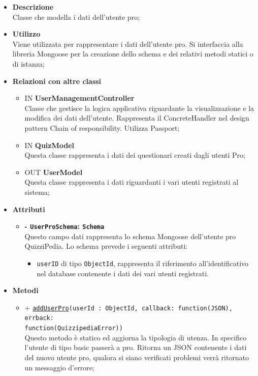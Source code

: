 \begin{itemize}
	\item \textbf{Descrizione} \\
	Classe che modella i dati dell'utente pro;
	\item \textbf{Utilizzo} \\
	Viene utilizzata per rappresentare i dati dell'utente pro. Si interfaccia alla libreria Mongoose per la creazione dello schema e dei relativi metodi statici o di istanza;
	\item \textbf{Relazioni con altre classi} 
		\begin{itemize}
			\item IN \textbf {UserManagementController} \\
			Classe che gestisce la logica applicativa riguardante la visualizzazione e la modifica dei dati dell'utente.
Rappresenta il ConcreteHandler nel design pattern Chain of responsibility. Utilizza Passport;
			\item IN \textbf{QuizModel} \\
			Questa classe rappresenta i dati dei questionari creati dagli utenti Pro;
			\item OUT \textbf{UserModel} \\
			Questa classe rappresenta i dati riguardanti i vari utenti registrati al sistema;
		\end{itemize}
	\item \textbf{Attributi} 
		\begin{itemize}
			\item \textbf{- \texttt{UserProSchema}: \texttt{Schema}} \\
			Questo campo dati rappresenta lo schema Mongoose dell'utente pro QuizziPedia. Lo schema prevede i seguenti attributi:
			\begin{itemize}
				\item 
					\texttt{userID} di tipo \texttt{ObjectId}, rappresenta il riferimento all'identificativo nel database contenente i dati dei vari utenti registrati.
			\end{itemize}		
		\end{itemize}	
	\item \textbf{Metodi}
		\begin{itemize}
		\item
		+ \texttt{\underline{addUserPro}(userId : ObjectId, callback: function(JSON), errback: \\function(QuizzipediaError))} \\	
		Questo metodo è statico ed aggiorna la tipologia di utenza. In specifico l'utente di tipo basic passerà a pro. Ritorna un JSON contenente i dati del nuovo utente pro, qualora si siano verificati problemi verrà ritornato un messaggio d'errore;	\\	

\end{itemize}
\end{itemize}
